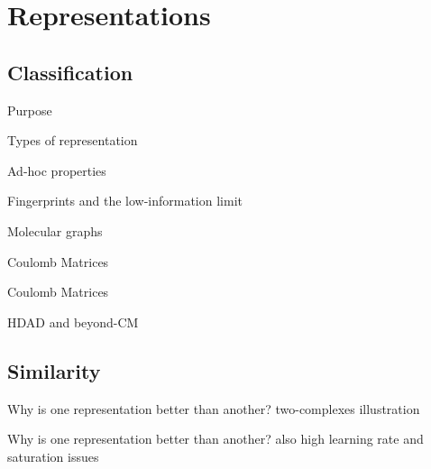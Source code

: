 
\section{Representations}
\subsection{Classification}
\begin{frame}{Purpose}

\end{frame}
\begin{frame}{Types of representation}

\end{frame}
\begin{frame}{Ad-hoc properties}

\end{frame}
\begin{frame}{Fingerprints and the low-information limit}

\end{frame}
\begin{frame}{Molecular graphs}

\end{frame}
\begin{frame}{Coulomb Matrices}

\end{frame}
\begin{frame}{Coulomb Matrices}

\end{frame}
\begin{frame}{HDAD and beyond-CM}

\end{frame}
\subsection{Similarity}
\begin{frame}{Why is one representation better than another?}
two-complexes illustration 
\end{frame}
\begin{frame}{Why is one representation better than another?}
also high learning rate and saturation issues
\end{frame}

